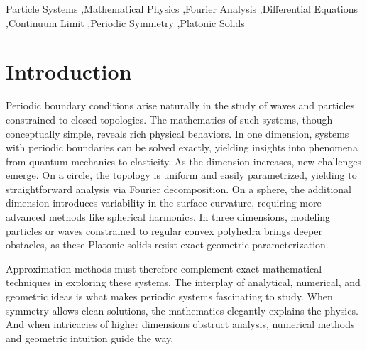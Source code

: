 \documentclass[final,5p,times,twocolumn,authoryear]{elsarticle}
\begin{document}
\begin{frontmatter}


\begin{keyword}
Particle Systems \sep Mathematical Physics \sep Fourier Analysis \sep Differential Equations \sep Continuum Limit \sep Periodic Symmetry \sep Platonic Solids



\end{keyword}


\end{frontmatter}




\section{Introduction}
\label{introduction}
Periodic boundary conditions arise naturally in the study of waves and particles constrained to closed topologies. The mathematics of such systems, though conceptually simple, reveals rich physical behaviors. In one dimension, systems with periodic boundaries can be solved exactly, yielding insights into phenomena from quantum mechanics to elasticity. As the dimension increases, new challenges emerge. On a circle, the topology is uniform and easily parametrized, yielding to straightforward analysis via Fourier decomposition. On a sphere, the additional dimension introduces variability in the surface curvature, requiring more advanced methods like spherical harmonics. In three dimensions, modeling particles or waves constrained to regular convex polyhedra brings deeper obstacles, as these Platonic solids resist exact geometric parameterization.

Approximation methods must therefore complement exact mathematical techniques in exploring these systems. The interplay of analytical, numerical, and geometric ideas is what makes periodic systems fascinating to study. When symmetry allows clean solutions, the mathematics elegantly explains the physics. And when intricacies of higher dimensions obstruct analysis, numerical methods and geometric intuition guide the way.
\end{document}
